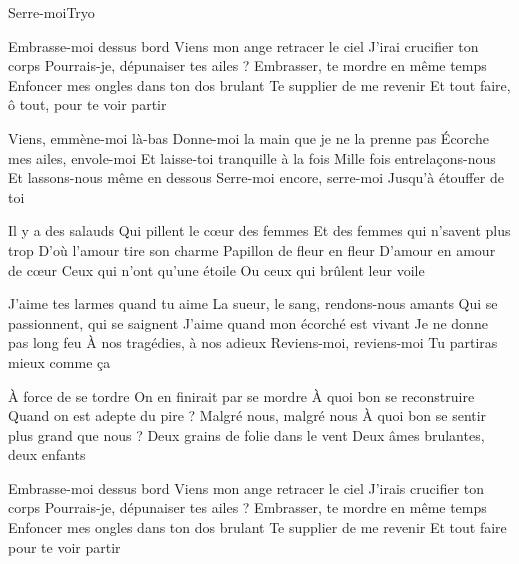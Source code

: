 \documentclass[a4paper,11pt,french]{article}
\begin{document}
\begin{Song}{Serre-moi}{Tryo}
\begin{multicols}{2}

\espaceInterStrophe

\begin{Verse}
Embrasse-moi dessus bord
Viens mon ange retracer le ciel
J'irai crucifier ton corps
Pourrais-je, dépunaiser tes ailes ?
Embrasser, te mordre en même temps
Enfoncer mes ongles dans ton dos brulant
Te supplier de me revenir
Et tout faire, ô tout, pour te voir partir
\espaceInterStrophe

Viens, emmène-moi là-bas
Donne-moi la main que je ne la prenne pas
Écorche mes ailes, envole-moi
Et laisse-toi tranquille à la fois
Mille fois entrelaçons-nous
Et lassons-nous même en dessous
Serre-moi encore, serre-moi
Jusqu'à étouffer de toi
\end{Verse}
\espaceInterStrophe

\begin{Chorus}
Il y a des salauds
Qui pillent le cœur des femmes
Et des femmes qui n'savent plus trop
D'où l'amour tire son charme
Papillon de fleur en fleur
D'amour en amour de cœur
Ceux qui n'ont qu'une étoile
Ou ceux qui brûlent leur voile
\end{Chorus}
\espaceInterStrophe

\espaceInterStrophe

\begin{Verse}
J'aime tes larmes quand tu aime
La sueur, le sang, rendons-nous amants
Qui se passionnent, qui se saignent
J'aime quand mon écorché est vivant
Je ne donne pas long feu
À nos tragédies, à nos adieux
Reviens-moi, reviens-moi
Tu partiras mieux comme ça
\columnbreak

À force de se tordre
On en finirait par se mordre
À quoi bon se reconstruire
Quand on est adepte du pire ?
Malgré nous, malgré nous
À quoi bon se sentir plus grand que nous ?
Deux grains de folie dans le vent
Deux âmes brulantes, deux enfants
\end{Verse}
\espaceInterStrophe

\aurefrain
\espaceInterStrophe

\begin{Verse}
Embrasse-moi dessus bord
Viens mon ange retracer le ciel
J'irais crucifier ton corps
Pourrais-je, dépunaiser tes ailes ?
Embrasser, te mordre en même temps
Enfoncer mes ongles dans ton dos brulant
Te supplier de me revenir
Et tout faire pour te voir partir
\espaceInterStrophe


\end{Verse}
\end{multicols}
\end{Song}
\end{document}
